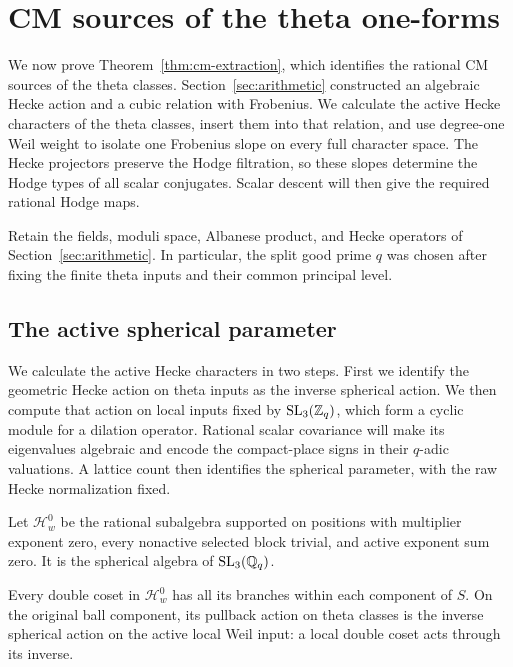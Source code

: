 \section{CM sources of the theta one-forms}\label{sec:cm-sources}

We now prove Theorem~\ref{thm:cm-extraction}, which identifies the
rational CM sources of the theta classes.  Section~\ref{sec:arithmetic}
constructed an algebraic Hecke action and a cubic relation with
Frobenius.  We calculate the active Hecke characters of the theta
classes, insert them into that relation, and use degree-one Weil
weight to isolate one Frobenius slope on every full character space.
The Hecke projectors preserve the Hodge filtration, so these slopes
determine the Hodge types of all scalar conjugates.  Scalar descent
will then give the required rational Hodge maps.

Retain the fields, moduli space, Albanese product, and Hecke operators
of Section~\ref{sec:arithmetic}.  In particular, the split good prime
\(q\) was chosen after fixing the finite theta inputs and their
common principal level.

\subsection{The active spherical parameter}\label{subsec:active-parameter}

We calculate the active Hecke characters in two steps.  First we
identify the geometric Hecke action on theta inputs as the inverse
spherical action.  We then compute that action on local inputs fixed
by \(\operatorname{SL}_3(\mathbb{Z}_q)\), which form a cyclic module for a dilation
operator.  Rational scalar covariance will
make its eigenvalues algebraic and encode the compact-place signs in
their \(q\)-adic valuations.  A lattice count then identifies the
spherical parameter, with the raw Hecke normalization fixed.

Let \(\mathcal H_w^0\) be the rational subalgebra supported on
positions with multiplier exponent zero, every nonactive selected
block trivial, and active exponent sum zero.  It is the spherical
algebra of \(\operatorname{SL}_3(\mathbb{Q}_q)\).

\begin{lemma}\label{lem:active-hecke-theta}
Every double coset in \(\mathcal H_w^0\) has all its branches
within each component of \(S\).  On the original ball component,
its pullback action on theta classes is the inverse spherical
action on the active local Weil input: a local double coset acts
through its inverse.
\end{lemma}

